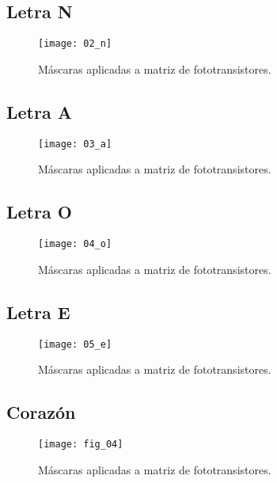 \subsection{Letra N}

            \begin{figure}[hbtp]
                \centering
                \texttt{[image: 02\_n]}
                \caption{Máscaras aplicadas a matriz de fototransistores.}
                \label{fig:02_n}
            \end{figure} 
\newpage
\subsection{Letra A}

            \begin{figure}[hbtp]
                \centering
                \texttt{[image: 03\_a]}
                \caption{Máscaras aplicadas a matriz de fototransistores.}
                \label{fig:03_a}
            \end{figure} 
\newpage
\subsection{Letra O}

            \begin{figure}[hbtp]
                \centering
                \texttt{[image: 04\_o]}
                \caption{Máscaras aplicadas a matriz de fototransistores.}
                \label{fig:04_o}
            \end{figure} 
\newpage
\subsection{Letra E}

            \begin{figure}[hbtp]
                \centering
                \texttt{[image: 05\_e]}
                \caption{Máscaras aplicadas a matriz de fototransistores.}
                \label{fig:05_e}
            \end{figure} 
\newpage
\subsection{Corazón}

            \begin{figure}[hbtp]
                \centering
                \texttt{[image: fig\_04]}
                \caption{Máscaras aplicadas a matriz de fototransistores.}
                \label{fig:fig_04}
            \end{figure} 
\newpage
